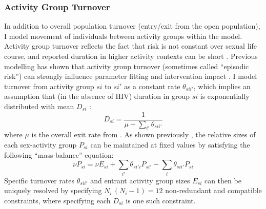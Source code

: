 \subsubsection{Activity Group Turnover}\label{model.par.turn.act}
In addition to overall population turnover (entry/exit from the open population),
I model movement of individuals between activity groups within the model.
Activity group turnover reflects the fact that risk is not constant over sexual life course,
and reported duration in higher activity contexts can be short \cite{Scorgie2012}.
Previous modelling has shown that activity group turnover (sometimes called ``episodic risk'')
can strongly influence parameter fitting and intervention impact \cite{Henry2015,Knight2020}.
I model turnover from activity group $si$ to $si'$ as a constant rate $\theta_{sii'}$,
which implies an assumption that (in the absence of HIV) duration in group $si$ is
exponentially distributed with mean $D_{si}$ \cite{Roberts2015}:
\begin{equation}\label{eq:model.par.dur}
  D_{si} = \frac{1}{\mu + \sum_{i'}\theta_{sii'}}
\end{equation}
where $\mu$ is the overall exit rate from .
As shown previously \cite{Knight2020}, the relative sizes of each sex-activity group $P_{si}$
can be maintained at fixed values by satisfying the following ``mass-balance'' equation:
\begin{equation}
  \nu P_{si} = \nu E_{si} + \sum_{i'} \theta_{si'i} P_{si'} - \sum_{i} \theta_{sii'} P_{si}
\end{equation}
Specific turnover rates $\theta_{sii'}$ and entrant activity group sizes $E_{si}$
can then be uniquely resolved by specifying
$N_i\,(N_i-1) = 12$ non-redundant and compatible constraints,
where specifying each $D_{si}$ is one such constraint.
